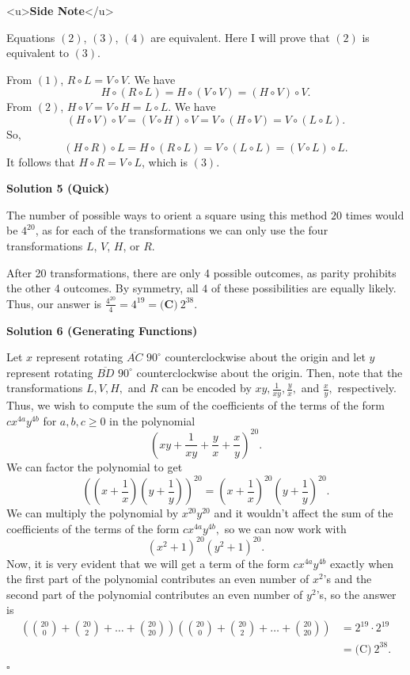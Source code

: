 \begin{enumerate}
 <u>\textbf{Side Note}</u>

 Equations $(2)$, $(3)$, $(4)$ are equivalent. Here I will prove that $(2)$ is equivalent to $(3)$.

 From $(1)$, $R \circ L = V \circ V$. We have
 \[H \circ (R \circ L) = H \circ (V \circ V) = (H \circ V) \circ V.\]From $(2)$, $H \circ V = V \circ H = L \circ L$. We have
 \[(H \circ V) \circ V = (V \circ H) \circ V = V \circ (H \circ V) = V \circ (L \circ L).\]So, 
 \[(H \circ R) \circ L = H \circ (R \circ L) = V \circ (L \circ L) = (V \circ L) \circ L.\]It follows that $H \circ R = V \circ L$, which is $(3)$.

 


 



\textbf{Solution 5 (Quick)}

The number of possible ways to orient a square using this method $20$ times would be $4^{20}$, as for each of the transformations we can only use the four transformations $L$, $V$, $H$, or $R$.

 After 20 transformations, there are only 4 possible outcomes, as parity prohibits the other 4 outcomes. By symmetry, all $4$ of these possibilities are equally likely. Thus, our answer is $\frac{4^{20}}{4} = 4^{19}=\boxed{\textbf{(C)}\ 2^{38}}.$




\textbf{Solution 6 (Generating Functions)}

Let $x$ represent rotating $\overline{AC}$ $90^\circ$ counterclockwise about the origin and let $y$ represent rotating $\overline{BD}$ $90^\circ$ counterclockwise about the origin. Then, note that the transformations $L, V, H,$ and $R$ can be encoded by $xy, \frac{1}{xy}, \frac{y}{x},$ and $\frac{x}{y},$ respectively. Thus, we wish to compute the sum of the coefficients of the terms of the form $cx^{4a}y^{4b}$ for $a, b, c \ge 0$ in the polynomial 
 \[(xy+\frac{1}{xy}+\frac{y}{x}+\frac{x}{y})^{20}.\] We can factor the polynomial to get 
 \[((x+\frac{1}{x})(y+\frac{1}{y}))^{20} = (x+\frac{1}{x})^{20}(y+\frac{1}{y})^{20}.\] We can multiply the polynomial by $x^{20}y^{20}$ and it wouldn't affect the sum of the coefficients of the terms of the form $cx^{4a}y^{4b},$ so we can now work with 
 \[(x^2+1)^{20}(y^2+1)^{20}.\] Now, it is very evident that we will get a term of the form $cx^{4a}y^{4b}$ exactly when the first part of the polynomial contributes an even number of $x^2$'s and the second part of the polynomial contributes an even number of $y^2$'s, so the answer is\begin{align*}\left(\binom{20}{0} + \binom{20}{2} + \ldots + \binom{20}{20}\right)\left(\binom{20}{0} + \binom{20}{2} + \ldots + \binom{20}{20}\right) &= 2^{19} \cdot 2^{19} \\&= \boxed{\text{(C)} \ 2^{38}}.\end{align*}
$\square$




\end{enumerate}
